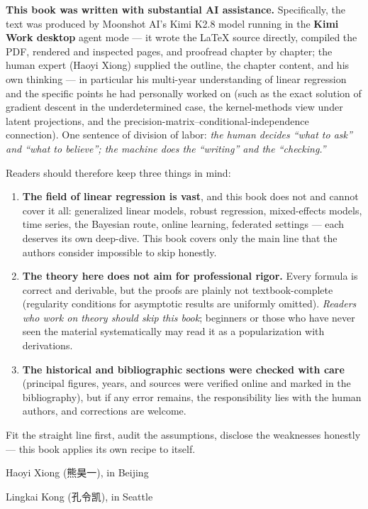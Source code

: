 \textbf{This book was written with substantial AI assistance.} Specifically, the text was produced by Moonshot AI's Kimi K2.8 model running in the \textbf{Kimi Work desktop} agent mode --- it wrote the LaTeX source directly, compiled the PDF, rendered and inspected pages, and proofread chapter by chapter; the human expert (Haoyi Xiong) supplied the outline, the chapter content, and his own thinking --- in particular his multi-year understanding of linear regression and the specific points he had personally worked on (such as the exact solution of gradient descent in the underdetermined case, the kernel-methods view under latent projections, and the precision-matrix--conditional-independence connection). One sentence of division of labor: \textit{the human decides ``what to ask'' and ``what to believe''; the machine does the ``writing'' and the ``checking.''}

Readers should therefore keep three things in mind:

\begin{enumerate}[label=(\alph*)]
  \item \textbf{The field of linear regression is vast}, and this book does not and cannot cover it all: generalized linear models, robust regression, mixed-effects models, time series, the Bayesian route, online learning, federated settings --- each deserves its own deep-dive. This book covers only the main line that the authors consider impossible to skip honestly.
  \item \textbf{The theory here does not aim for professional rigor.} Every formula is correct and derivable, but the proofs are plainly not textbook-complete (regularity conditions for asymptotic results are uniformly omitted). \textit{Readers who work on theory should skip this book}; beginners or those who have never seen the material systematically may read it as a popularization with derivations.
  \item \textbf{The historical and bibliographic sections were checked with care} (principal figures, years, and sources were verified online and marked in the bibliography), but if any error remains, the responsibility lies with the human authors, and corrections are welcome.
\end{enumerate}

Fit the straight line first, audit the assumptions, disclose the weaknesses honestly --- this book applies its own recipe to itself.

\vspace{1em}
\hfill Haoyi Xiong (熊昊一), in Beijing

\hfill Lingkai Kong (孔令凯), in Seattle
